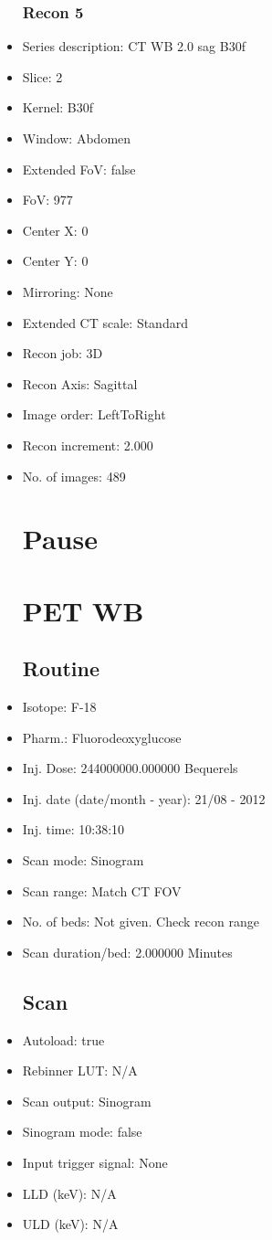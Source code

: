 \documentclass[12pt]{article}
\begin{document}
\begin{itemize}
\subsubsection{Recon 5}
\item Series description: CT WB 2.0 sag B30f
\item Slice: 2
\item Kernel: B30f
\item Window: Abdomen
\item Extended FoV: false
\item FoV: 977
\item Center X: 0
\item Center Y: 0
\item Mirroring: None
\item Extended CT scale: Standard
\item Recon job: 3D
\item Recon Axis: Sagittal
\item Image order: LeftToRight
\item Recon increment: 2.000
\item No. of images: 489
\section{Pause}
\section{PET WB}\subsection{Routine}
\item Isotope: F-18
\item Pharm.: Fluorodeoxyglucose
\item Inj. Dose: 244000000.000000 Bequerels
\item Inj. date (date/month - year): 21/08 - 2012
\item Inj. time: 10:38:10
\item Scan mode: Sinogram
\item Scan range: Match CT FOV
\item No. of beds: Not given. Check recon range
\item Scan duration/bed: 2.000000 Minutes
\subsection{Scan}
\item Autoload: true
\item Rebinner LUT: N/A
\item Scan output: Sinogram
\item Sinogram mode: false
\item Input trigger signal: None
\item LLD (keV): N/A
\item ULD (keV): N/A

\end{itemize}
\end{document}
